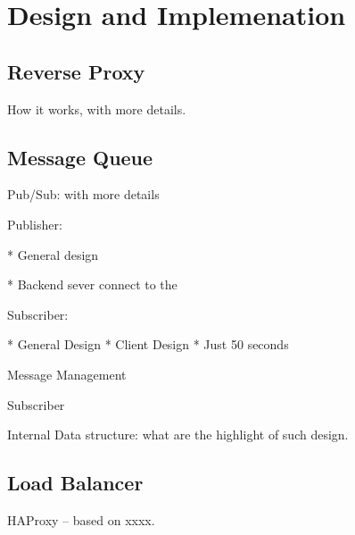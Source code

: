 \section {Design and Implemenation\\}

\subsection{Reverse Proxy\\}

How it works, with more details.

\subsection{Message Queue\\}

Pub/Sub: with more details

Publisher: 

    * General design

    * Backend sever connect to the 

Subscriber: 

    * General Design
    * Client Design
    * Just 50 seconds

Message Management

Subscriber

Internal Data structure: what are the highlight of such design.

\subsection{Load Balancer\\}

HAProxy -- based on xxxx.

